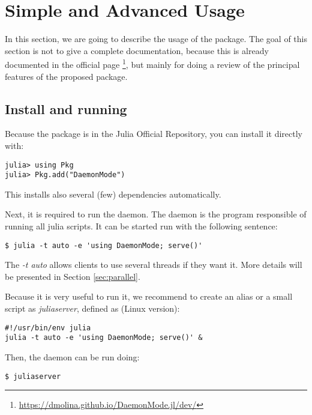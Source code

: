 \documentclass{juliacon}
\begin{document}
\section{Simple and Advanced Usage}
\label{sec:usage}

In this section, we are going to describe the usage of the package. The goal of
this section is not to give a complete documentation, because this is already
documented in the official page
\footnote{\url{https://dmolina.github.io/DaemonMode.jl/dev/}}, but mainly for
doing a review of the principal features of the proposed package.

\subsection{Install and running}
\label{sec:install}

Because the package is in the Julia Official Repository, you can install it 
directly with:


\begin{minipage}[\textwidth]{\linewidth}
  \begin{lstlisting}
julia> using Pkg
julia> Pkg.add("DaemonMode")
  \end{lstlisting}
\end{minipage}

This installs also several (few) dependencies automatically.

Next, it is required to run the daemon. The daemon is the program responsible of
running all julia scripts. It can be started run with the following sentence:

\begin{lstlisting}
$ julia -t auto -e 'using DaemonMode; serve()'
\end{lstlisting}

The \textit{-t auto} allows clients to use several threads if they want it. More
details will be presented in Section \ref{sec:parallel}.

Because it is very useful to run it, we recommend to create an alias or a small 
script as \textit{juliaserver}, defined as (Linux version):

\begin{lstlisting}
#!/usr/bin/env julia
julia -t auto -e 'using DaemonMode; serve()' &  
\end{lstlisting}

Then, the daemon can be run doing:

\begin{lstlisting}
$ juliaserver
\end{lstlisting}
\end{document}
